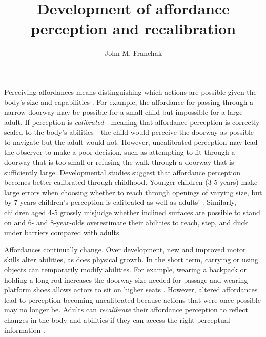 \documentclass[a4paper,man,natbib,floatsintext,noextraspace]{apa6}
\title{Development of affordance perception and recalibration}
\author{John M. Franchak}
\affiliation{University of California, Riverside}
\begin{document}
\maketitle

Perceiving affordances means distinguishing which actions are possible given the body's size and capabilities \citep{Gibson79}. For example, the affordance for passing through a narrow doorway may be possible for a small child but impossible for a large adult. If perception is \textit{calibrated}---meaning that affordance perception is correctly scaled to the body's abilities---the child would perceive the doorway as possible to navigate but the adult would not. However, uncalibrated perception may lead the observer to make a poor decision, such as attempting to fit through a doorway that is too small or refusing the walk through a doorway that is sufficiently large. Developmental studies suggest that affordance perception becomes better calibrated through childhood. Younger children (3-5 years) make large errors when choosing whether to reach through openings of varying size, but by 7 years children’s perception is calibrated as well as adults' \citep{ChildReaching}. Similarly, children aged 4-5 grossly misjudge whether inclined surfaces are possible to stand on \citep{KlevbergAnderson} and 6- and 8-year-olds overestimate their abilities to reach, step, and duck under barriers \citep{Plumert95} compared with adults.

Affordances continually change. Over development, new and improved motor skills alter abilities, as does physical growth. In the short term, carrying or using objects can temporarily modify abilities. For example, wearing a backpack or holding a long rod increases the doorway size needed for passage \citep{Recal,DoorwayLearning,Yasuda} and wearing platform shoes allows actors to sit on higher seats \citep{Mark87}. However, altered affordances lead to perception becoming uncalibrated because actions that were once possible may no longer be. Adults can \textit{recalibrate} their affordance perception to reflect changes in the body and abilities if they can access the right perceptual information \citep{Recal,DoorwayLearning,Mark87,MarkSitting90}. 
\end{document}
